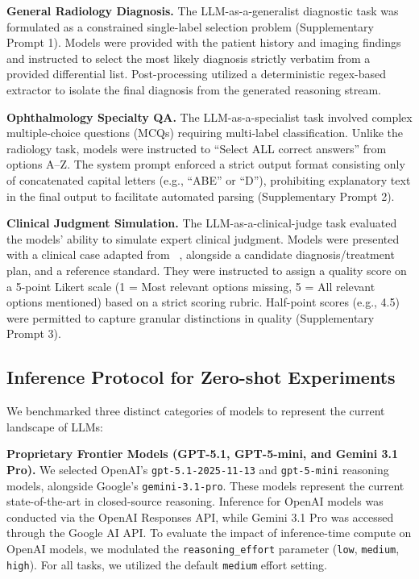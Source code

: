 \documentclass[10pt,journal,compsoc, onecolumn]{IEEEtran}
\begin{document}
\textbf{General Radiology Diagnosis.}
The LLM-as-a-generalist diagnostic task was formulated as a constrained single-label selection problem (Supplementary Prompt 1). Models were provided with the patient history and imaging findings and instructed to select the most likely diagnosis strictly verbatim from a provided differential list. Post-processing utilized a deterministic regex-based extractor to isolate the final diagnosis from the generated reasoning stream.

\textbf{Ophthalmology Specialty QA.}
The LLM-as-a-specialist task involved complex multiple-choice questions (MCQs) requiring multi-label classification. Unlike the radiology task, models were instructed to ``Select ALL correct answers'' from options A–Z. The system prompt enforced a strict output format consisting only of concatenated capital letters (e.g., ``ABE'' or ``D''), prohibiting explanatory text in the final output to facilitate automated parsing  (Supplementary Prompt 2).

\textbf{Clinical Judgment Simulation.}
The LLM-as-a-clinical-judge task evaluated the models' ability to simulate expert clinical judgment. Models were presented with a clinical case adapted from ~\cite{eval-deepseek125Patients}, alongside a candidate diagnosis/treatment plan, and a reference standard. They were instructed to assign a quality score on a 5-point Likert scale (1 = Most relevant options missing, 5 = All relevant options mentioned) based on a strict scoring rubric. Half-point scores (e.g., 4.5) were permitted to capture granular distinctions in quality  (Supplementary Prompt 3).

\subsection*{Inference Protocol for Zero-shot Experiments}

We benchmarked three distinct categories of models to represent the current landscape of LLMs:

\textbf{Proprietary Frontier Models (GPT-5.1, GPT-5-mini, and Gemini 3.1 Pro).}
We selected OpenAI’s \texttt{gpt-5.1-2025-11-13} and \texttt{gpt-5-mini} reasoning models, alongside Google’s \texttt{gemini-3.1-pro}. These models represent the current state-of-the-art in closed-source reasoning. Inference for OpenAI models was conducted via the OpenAI Responses API, while Gemini 3.1 Pro was accessed through the Google AI API. To evaluate the impact of inference-time compute on OpenAI models, we modulated the \texttt{reasoning\_effort} parameter (\texttt{low}, \texttt{medium}, \texttt{high}). For all tasks, we utilized the default \texttt{medium} effort setting.
\end{document}

